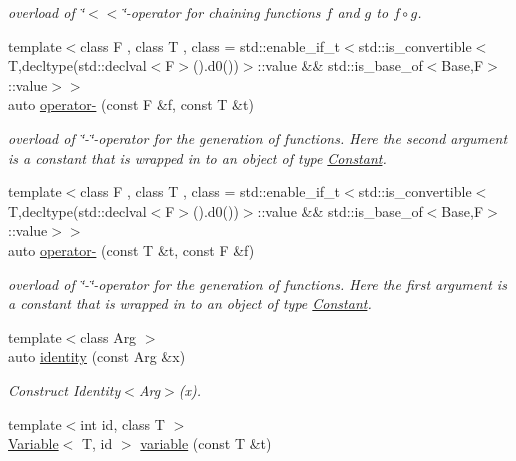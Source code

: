 \begin{DoxyCompactItemize}
\begin{DoxyCompactList}\small\item\em overload of \char`\"{}$<$$<$\char`\"{}-\/operator for chaining functions $f$ and $g$ to $ f \circ g $. \end{DoxyCompactList}\item 
{\footnotesize template$<$class F , class T , class  = std\-::enable\-\_\-if\-\_\-t$<$std\-::is\-\_\-convertible$<$\-T,decltype(std\-::declval$<$\-F$>$().\-d0())$>$\-::value \&\&                                     std\-::is\-\_\-base\-\_\-of$<$\-Base,\-F$>$\-::value$>$$>$ }\\auto \hyperlink{namespaceRFFGen_a933ac482bf44b977bbe2ce057362b55a}{operator-\/} (const F \&f, const T \&t)
\begin{DoxyCompactList}\small\item\em overload of \char`\"{}-\/\char`\"{}-\/operator for the generation of functions. Here the second argument is a constant that is wrapped in to an object of type \hyperlink{structRFFGen_1_1Constant}{Constant}. \end{DoxyCompactList}\item 
{\footnotesize template$<$class F , class T , class  = std\-::enable\-\_\-if\-\_\-t$<$std\-::is\-\_\-convertible$<$\-T,decltype(std\-::declval$<$\-F$>$().\-d0())$>$\-::value \&\&                                     std\-::is\-\_\-base\-\_\-of$<$\-Base,\-F$>$\-::value$>$$>$ }\\auto \hyperlink{namespaceRFFGen_a7b334216a1a47d21c0ecb857ad279580}{operator-\/} (const T \&t, const F \&f)
\begin{DoxyCompactList}\small\item\em overload of \char`\"{}-\/\char`\"{}-\/operator for the generation of functions. Here the first argument is a constant that is wrapped in to an object of type \hyperlink{structRFFGen_1_1Constant}{Constant}. \end{DoxyCompactList}\item 
\hypertarget{namespaceRFFGen_af20942553f30cb8b3a7dc84b9581aeb3}{{\footnotesize template$<$class Arg $>$ }\\auto \hyperlink{namespaceRFFGen_af20942553f30cb8b3a7dc84b9581aeb3}{identity} (const Arg \&x)}\label{namespaceRFFGen_af20942553f30cb8b3a7dc84b9581aeb3}

\begin{DoxyCompactList}\small\item\em Construct Identity$<$\-Arg$>$(x). \end{DoxyCompactList}\item 
\hypertarget{namespaceRFFGen_a9ff332846164ad83741fdb7b7f62a0d6}{{\footnotesize template$<$int id, class T $>$ }\\\hyperlink{structRFFGen_1_1Variable}{Variable}$<$ T, id $>$ \hyperlink{namespaceRFFGen_a9ff332846164ad83741fdb7b7f62a0d6}{variable} (const T \&t)}\label{namespaceRFFGen_a9ff332846164ad83741fdb7b7f62a0d6}


\end{DoxyCompactItemize}
